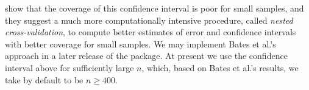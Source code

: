 \documentclass[
]{jss}
\begin{document}
\citet{BatesHastieTibshirani:2023} show that the coverage of this
confidence interval is poor for small samples, and they suggest a much
more computationally intensive procedure, called \emph{nested
cross-validation}, to compute better estimates of error and confidence
intervals with better coverage for small samples. We may implement Bates
et al.'s approach in a later release of the  package. At present
we use the confidence interval above for sufficiently large \(n\),
which, based on Bates et al.'s results, we take by default to be
\(n \ge 400\).


\end{document}
